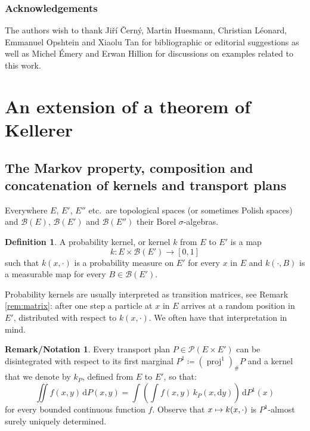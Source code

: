 \documentclass[JEP,XML,SOM,Unicode,NoEqCountersInSection,NoFloatCountersInSection,published]{cedram}
\newcommand\mto{\mathchoice{\longmapsto}{\mapsto}{\mapsto}{\mapsto}}
\theoremstyle{plain}
\theoremstyle{definition}
\newtheorem{defi}[them]{Definition}
\newtheorem{remnotation}[them]{Remark/Notation} %
\newcommand{\dd}{\mathrm{d}}
\newcommand{\eqdefup}{\coloneqq}
\newcommand{\p}{\mathcal{P}}
\newcommand{\pr}{\operatorname{proj}}
\begin{document}
\subsubsection*{Acknowledgements} The authors wish to thank Ji\v rí \v Cern\'y, Martin Huesmann, Christian Léonard, Emmanuel Opshtein and Xiaolu Tan for bibliographic or editorial suggestions as well as Michel Émery and Erwan Hillion for discussions on examples related to this work.

\section{An extension of a theorem of Kellerer}\label{sec:concatenation+kellerer+boujui}

\subsection{The Markov property, composition and concatenation of kernels and transport plans}\label{subsec:kernels_markov}

Everywhere $E$, $E'$, $E''$ etc.\ are topological spaces (or sometimes Polish spaces) and $\mathcal{B}(E)$, $\mathcal{B}(E')$ and $\mathcal{B}(E'')$ their Borel $\sigma$-algebras.

\begin{defi}
A probability kernel, or kernel $k$ from $E$ to $E'$ is a map\vspace*{-3pt}\enlargethispage{.5\baselineskip}%
\[
k:E\times \mathcal{B}(E')\to [0,1]
\]
such that $k(x,\cdot)$ is a probability measure on $E'$ for every $x$ in $E$ and $k(\cdot,B)$ is a measurable map for every $B\in {\mathcal B}(E')$.
\end{defi}

Probability kernels are usually interpreted as transition matrices, see Remark \ref{rem:matrix}: after one step a particle at $x$ in $E$ arrives at a random position in $E'$, distributed with respect to $k(x,\cdot)$. We often have that interpretation in mind.

\begin{remnotation}\label{notation:k_P}Every transport plan $P\in\p(E\times E')$ can be disintegrated with respect to its first marginal $P^1\eqdefup(\pr^1)_\#P$ and a kernel that we denote by $k_P$, defined from $E$ to $E'$, so that:\vspace*{-3pt}
\[\iint f(x,y)\,\dd P(x,y)=\int\left(\int f(x,y)\,k_P(x,\dd y)\right)\,\dd P^1(x)\]
for every bounded continuous function $f$. Observe that $x\mto k(x,\cdot)$ is $P^1$-almost surely uniquely determined.
\end{remnotation}
\end{document}
